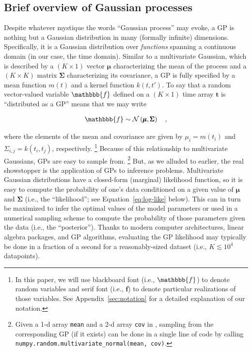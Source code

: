 \documentclass[modern,linenumbers]{aastex62}
\begin{document}
\subsection{Brief overview of Gaussian processes}
\label{sec:gp-intro}

Despite whatever mystique the words ``Gaussian process'' may evoke, a GP
is nothing but a Gaussian distribution in many (formally infinite)
dimensions. Specifically, it is a Gaussian distribution over
\emph{functions} spanning a continuous domain (in our case, the time domain).
Similar to a multivariate Gaussian, which is described by
a $(K \times 1)$ vector $\pmb{\mu}$ characterizing
the mean of the process and a $(K \times K)$
matrix $\pmb{\Sigma}$ characterizing its covariance,
a GP is fully specified by a mean
function $m(t)$ and a kernel function $k(t, t')$.
To say that a random vector-valued variable $\mathbbb{f}$
defined on a $(K \times 1)$ time array $\mathbf{t}$
is ``distributed as a GP'' means that we may write
%
\begin{linenomath}\begin{align}
        \label{eq:fnormal}
        \mathbbb{f} \sim \mathcal{N}\left( \pmb{\mu}, \pmb{\Sigma} \right)
        \quad,
    \end{align}\end{linenomath}
%
where the elements of the mean and covariance are given by
$\mu_i = m(t_i)$ and $\Sigma_{i,j} = k(t_i, t_j)$, respectively.%
\footnote{%
    In this paper, we will use blackboard font (i.e., $\mathbbb{f}$) to
    denote random variables and serif font (i.e., $\mathbf{f}$) to denote
    particular realizations of those variables.
    See Appendix~\ref{sec:notation} for a detailed explanation of our notation.
}
Because of this relationship to multivariate Gaussians,
GPs are easy to sample from.%
\footnote{Given a 1-d array \texttt{mean} and a 2-d array \texttt{cov} in \Python,
    sampling from the corresponding GP (if it exists)
    can be done in a single line of code by calling
    \texttt{numpy.random.multivariate\_normal(mean, cov)}.}
But, as we alluded to earlier, the real showstopper is the application of GPs to inference problems.
Multivariate Gaussian distributions have a closed-form (marginal) likelihood
function, so it is easy to compute the probability
of one's data conditioned on a given value of $\pmb{\mu}$ and $\pmb{\Sigma}$
(i.e., the ``likelihood''; see Equation~\ref{eq:log-like} below).
This can in turn be maximized
to infer the optimal values of the model parameters
or used in a
numerical sampling scheme to compute the probability of those parameters
given the data (i.e., the ``posterior'').
Thanks to modern computer architectures, linear algebra packages, and
GP algorithms,
evaluating the GP likelihood may typically be done in a fraction of a second
for a reasonably-sized dataset (i.e., $K \lesssim 10^4$ datapoints).
\end{document}
